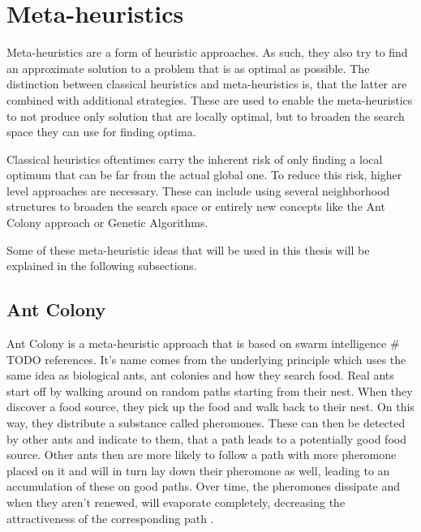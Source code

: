 \section{Meta-heuristics}
\label{sec:metaHeuristics}

Meta-heuristics are a form of heuristic approaches.
As such, they also try to find an approximate solution to a problem that is as optimal as possible.
The distinction between classical heuristics and meta-heuristics is, that the latter are combined with additional strategies.
These are used to enable the meta-heuristics to not produce only solution that are locally optimal, but to broaden the search space they can use for finding optima.

Classical heuristics oftentimes carry the inherent risk of only finding a local optimum that can be far from the actual global one.
To reduce this risk, higher level approaches are necessary.
These can include using several neighborhood structures to broaden the search space or entirely new concepts like the Ant Colony approach or Genetic Algorithms. \cite{gendreau_handbook_2010}

Some of these meta-heuristic ideas that will be used in this thesis will be explained in the following subsections.



\subsection{Ant Colony}
\label{subsec:antColonyBackground}

Ant Colony is a meta-heuristic approach that is based on swarm intelligence \# TODO references. 
It's name comes from the underlying principle which uses the same idea as biological ants, ant colonies and how they search food.
Real ants start off by walking around on random paths starting from their nest. 
When they discover a food source, they pick up the food and walk back to their nest.
On this way, they distribute a substance called pheromones.
These can then be detected by other ants and indicate to them, that a path leads to a potentially good food source. 
Other ants then are more likely to follow a path with more pheromone placed on it and will in turn lay down their pheromone as well, leading to an accumulation of these on good paths.
Over time, the pheromones dissipate and when they aren't renewed, will evaporate completely, decreasing the attractiveness of the corresponding path \cite{dorigo_ant_1996}. 

